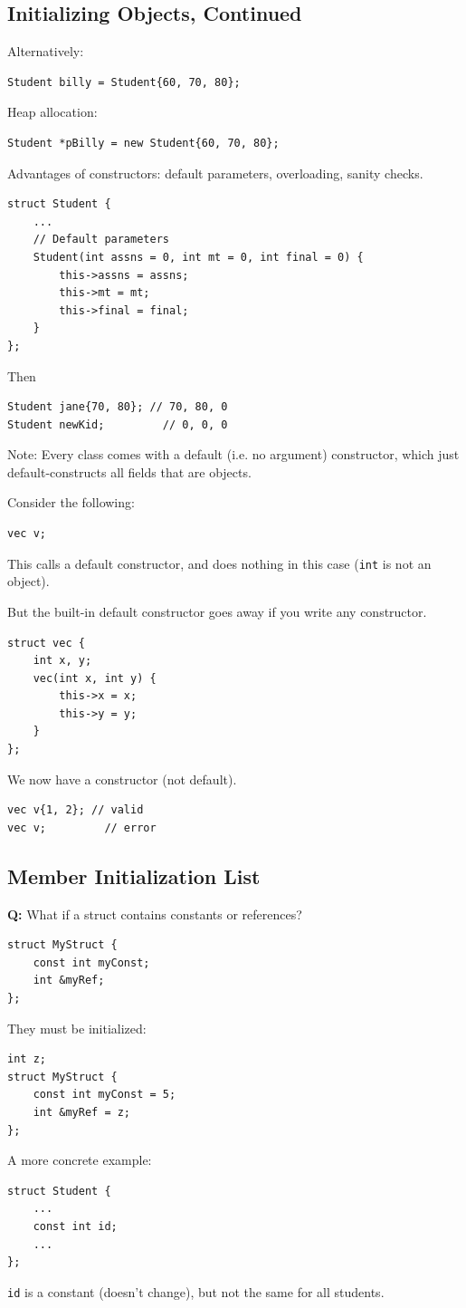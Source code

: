 \documentclass[11pt]{article}
\theoremstyle{definition}
\begin{document}
\subsection{Initializing Objects, Continued}
Alternatively:
\begin{lstlisting}
Student billy = Student{60, 70, 80};
\end{lstlisting}
Heap allocation:
\begin{lstlisting}
Student *pBilly = new Student{60, 70, 80};
\end{lstlisting}
Advantages of constructors: default parameters, overloading, sanity checks.
\begin{lstlisting}
struct Student {
    ...
    // Default parameters
    Student(int assns = 0, int mt = 0, int final = 0) {
        this->assns = assns;
        this->mt = mt;
        this->final = final;
    }
};
\end{lstlisting}
Then
\begin{lstlisting}
Student jane{70, 80}; // 70, 80, 0
Student newKid;         // 0, 0, 0
\end{lstlisting}
Note: Every class comes with a default (i.e. no argument) constructor, which just default-constructs all fields that are objects.

Consider the following:
\begin{lstlisting}
vec v; 
\end{lstlisting}
This calls a default constructor, and does nothing in this case ({\tt int} is not an object).

But the built-in default constructor goes away if you write any constructor.

\begin{lstlisting}
struct vec {
    int x, y;
    vec(int x, int y) {
        this->x = x;
        this->y = y;
    }
};
\end{lstlisting}
We now have a constructor (not default).
\begin{lstlisting}
vec v{1, 2}; // valid
vec v;         // error
\end{lstlisting}

\subsection{Member Initialization List}
{\bf Q:} What if a struct contains constants or references?
\begin{lstlisting}
struct MyStruct {
    const int myConst;
    int &myRef;
};
\end{lstlisting}
They must be initialized:
\begin{lstlisting}
int z;
struct MyStruct {
    const int myConst = 5;
    int &myRef = z;
};
\end{lstlisting}
A more concrete example:
\begin{lstlisting}
struct Student {
    ...
    const int id;
    ...
};
\end{lstlisting}
{\tt id} is a constant (doesn't change), but not the same for all students.
\end{document}
